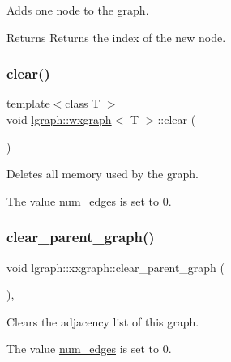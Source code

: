Adds one node to the graph. 

\begin{DoxyReturn}{Returns}
Returns the index of the new node. 
\end{DoxyReturn}
\mbox{\label{classlgraph_1_1wxgraph_a5ce8055002673c718131a091b3f17fc0}} 
\subsubsection{\texorpdfstring{clear()}{clear()}}
{\footnotesize\ttfamily template$<$class T $>$ \\
void \hyperlink{classlgraph_1_1wxgraph}{lgraph\+::wxgraph}$<$ T $>$\+::clear (\begin{DoxyParamCaption}{ }\end{DoxyParamCaption})}



Deletes all memory used by the graph. 

The value \hyperlink{classlgraph_1_1xxgraph_a6765a9a3be42f6e0f824635c593b35d7}{num\+\_\+edges} is set to 0. \mbox{\label{classlgraph_1_1xxgraph_a4122495066e4402cbf6d2d9bb82d54cc}} 
\subsubsection{\texorpdfstring{clear\+\_\+parent\+\_\+graph()}{clear\_parent\_graph()}}
{\footnotesize\ttfamily void lgraph\+::xxgraph\+::clear\+\_\+parent\+\_\+graph (\begin{DoxyParamCaption}{ }\end{DoxyParamCaption})\hspace{0.3cm}{\ttfamily [protected]}, {\ttfamily [inherited]}}



Clears the adjacency list of this graph. 

The value \hyperlink{classlgraph_1_1xxgraph_a6765a9a3be42f6e0f824635c593b35d7}{num\+\_\+edges} is set to 0. \mbox{\label{classlgraph_1_1xxgraph_a20ebc2927ee8fb8bb0a2c3b448d9ed78}} 
